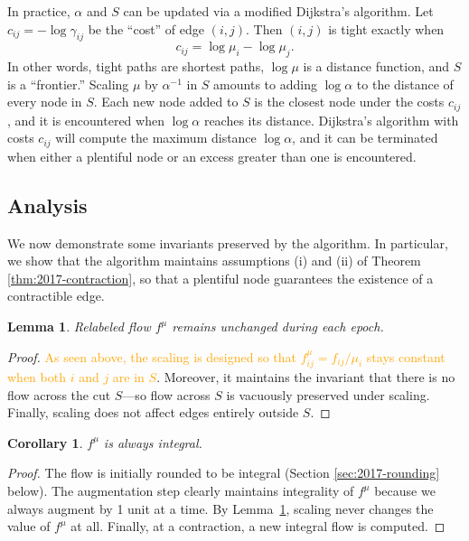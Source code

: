 \documentclass[11pt]{article}
\newtheorem{corollary}{Corollary}[theorem]
\newtheorem{lemma}[theorem]{Lemma}
\theoremstyle{definition}
\theoremstyle{definition}
\theoremstyle{definition}
\newcommand{\gij}{\gamma_{ij}}
\newcommand{\cbb}[1]{\textcolor{orange}{#1}}
\begin{document}
    In practice, $\alpha$ and $S$ can be updated via a modified Dijkstra's algorithm.
    Let $c_{ij} = - \log \gij$ be the ``cost'' of edge $(i, j)$.
    Then $(i, j)$ is tight exactly when
    \[ c_{ij} = \log \mu_i - \log \mu_j. \]
    In other words, tight paths are shortest paths, $\log \mu$ is a distance function,
    and $S$ is a ``frontier.'' Scaling $\mu$ by $\alpha^{-1}$ in $S$ amounts to adding
    $\log \alpha$ to the distance of every node in $S$. Each new node added to $S$
    is the closest node under the costs $c_{ij}$, and it is encountered when $\log \alpha$
    reaches its distance.
    Dijkstra's algorithm with costs $c_{ij}$ will compute the maximum distance $\log \alpha$,
    and it can be terminated when either a plentiful node or an excess greater than
    one is encountered.

	\subsection{Analysis}
	We now demonstrate some invariants preserved by the algorithm. In particular,
	we show that the algorithm maintains assumptions (i) and (ii) of
	Theorem \ref{thm:2017-contraction}, so that a plentiful node guarantees the
	existence of a contractible edge.
    \begin{lemma}
    Relabeled flow $f^{\mu}$ remains unchanged during each epoch.
    \label{lem:fsame}
    \end{lemma} 
    \begin{proof}
			\cbb{As seen above, the scaling is designed so that $f_{ij}^\mu = f_{ij}/\mu_i$
			stays constant when both $i$ and $j$ are in $S$}. Moreover, it maintains the
    	invariant that there is no flow across the cut $S$---so flow across $S$ is vacuously
    	preserved under scaling. Finally, scaling does not affect edges entirely
    	outside $S$.
    \end{proof}
    \begin{corollary}
    $f^{\mu}$ is always integral.
    \end{corollary}
    \begin{proof}
    The flow is initially rounded to be integral (Section \ref{sec:2017-rounding} below). 
    The augmentation step clearly maintains integrality of $f^{\mu}$ because we
    always augment by 1 unit at a time. By
    Lemma~\ref{lem:fsame}, scaling never changes the value of $f^{\mu}$ at all.
    Finally, at a contraction, a new integral flow is computed.
    \end{proof}
\end{document}
